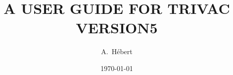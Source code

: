 \documentclass{report}
\begin{document}
\title{A USER GUIDE FOR TRIVAC VERSION5}

\author{A.~H\'ebert}

\date{\today}


                




\clearpage
{}
\tableofcontents
\clearpage
{}
\listoffigures
\clearpage
{}
\listoftables

\Debutdutexte



\clearpage
{}

\clearpage
{}
\printindex
\end{document}
